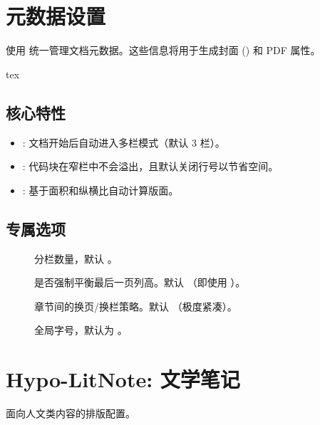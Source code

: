 \documentclass[
    outputdir=build,
    colorscheme=Tech,
    shorthand=true,
    code=true,
    fontset=lit
]{Hypo-Note}
\begin{document}
\section{元数据设置}

使用  统一管理文档元数据。这些信息将用于生成封面 () 和 PDF 属性。

\begin{hypocode}{tex}
\end{hypocode}

\subsection{核心特性}
\begin{itemize}
    \item {}: 文档开始后自动进入多栏模式（默认 3 栏）。
    \item {}: 代码块在窄栏中不会溢出，且默认关闭行号以节省空间。
    \item {}: 基于面积和纵横比自动计算版面。
\end{itemize}

\subsection{专属选项}
\begin{description}
    \item[] 分栏数量，默认 。
    \item[] 是否强制平衡最后一页列高。默认 （即使用 ）。
    \item[] 章节间的换页/换栏策略。默认 （极度紧凑）。
    \item[] 全局字号，默认为 。
\end{description}

\section{Hypo-LitNote: 文学笔记}

面向人文类内容的排版配置。
\end{document}
